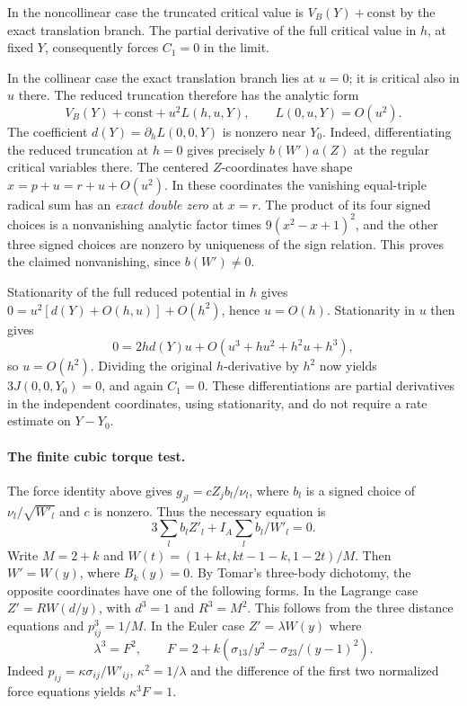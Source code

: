 \documentclass[11pt,letterpaper]{article}
\theoremstyle{definition}
\begin{document}
In the noncollinear case the truncated critical value is
\(V_B(Y)+\mathrm{const}\) by the exact translation branch. The
partial derivative of the full critical value in \(h\), at fixed
\(Y\), consequently forces \(C_1=0\) in the limit.

In the collinear case the exact translation branch lies at \(u=0\);
it is critical also in \(u\) there. The reduced truncation therefore
has the analytic form
\[
  V_B(Y)+\mathrm{const}+u^2 L(h,u,Y),\qquad L(0,u,Y)=O(u^2).
\]
The coefficient \(d(Y)=\partial_h L(0,0,Y)\) is nonzero near
\(Y_0\). Indeed, differentiating the reduced truncation at \(h=0\)
gives precisely \(b(W')a(Z)\) at the regular critical variables there.
The centered \(Z\)-coordinates have shape \(x=p+u=r+u+O(u^2)\).
In these coordinates the vanishing equal-triple radical sum has an
\emph{exact double zero} at \(x=r\). The product of its four signed
choices is a nonvanishing analytic factor times \(9(x^2-x+1)^2\),
and the other three signed choices are nonzero by uniqueness of the
sign relation. This proves the claimed nonvanishing, since \(b(W')\ne0\).

Stationarity of the full reduced potential in \(h\) gives
\(0=u^2[d(Y)+O(h,u)]+O(h^2)\), hence \(u=O(h)\). Stationarity
in \(u\) then gives
\[
 0=2h d(Y)u+O(u^3+h u^2+h^2u+h^3),
\]
so \(u=O(h^2)\). Dividing the original \(h\)-derivative by \(h^2\)
now yields \(3J(0,0,Y_0)=0\), and again \(C_1=0\). These differentiations
are partial derivatives in the independent coordinates, using
stationarity, and do not require a rate estimate on \(Y-Y_0\).

\paragraph{The finite cubic torque test.}
The force identity above gives \(g_{jl}=c Z_j b_l/\nu_l\),
where \(b_l\) is a signed choice of \(\nu_l/\sqrt{W'_l}\) and \(c\)
is nonzero. Thus the necessary equation is
\[
  3\sum_l b_l Z'_l + I_A\sum_l b_l/W'_l=0.
\]
Write \(M=2+k\) and
\(W(t)=(1+kt,kt-1-k,1-2t)/M\).
Then \(W'=W(y)\), where \(B_k(y)=0\). By Tomar's three-body
dichotomy, the opposite coordinates have one of the following forms.
In the Lagrange case \(Z'=R W(d/y)\), with \(d^3=1\) and \(R^3=M^2\).
This follows from the three distance equations and \(p_{ij}^3=1/M\).
In the Euler case \(Z'=\lambda W(y)\) where
\[
 \lambda^3=F^2,\qquad
 F=2+k\left(\sigma_{13}/y^2-\sigma_{23}/(y-1)^2\right).
\]
Indeed \(p_{ij}=\kappa\sigma_{ij}/W'_{ij}\), \(\kappa^2=1/\lambda\)
and the difference of the first two normalized force equations yields
\(\kappa^3F=1\).
\end{document}
